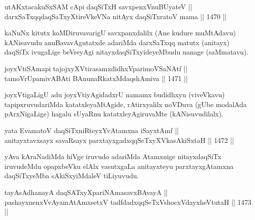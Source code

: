 \begin{shl}
utAKxtacakuSxSAM cApi daqSiTxH savxpenxV\s nuBUyateV || \\
darxSaTxqqdaqSaTxyXtireVkeVNa nitAyx daqSiTxratoV mama \hfill || 1470 ||  
\end{shl}

\begin{artha}
kaNuNx kitutx koMDiruvavarigU savxpanxdalilx (Ane kudure muMtAdavu) kANisuvudu anuBavavAgutatxde adariMda darxSaTxqq matutx (anitayx) daqSiTx ivugaLige beVreyAgi nitayxdaqSiTxyideyeMbudu nanage (saMmatavu).
\end{artha}


\begin{shl}
joyxVtiSAmapi tajojxyXVtirasamxdidhxVparimoVSaNAtf || \\
tamoVrUpamivA\s \s BAti BAnunaRkatxMdaqshAmiva \hfill || 1471 ||  
\end{shl}

\begin{artha}
joyxVtigaLigU adu joyxVtiyAgidadxrU namamx budidhxyu (viveVkavu) tapipxruvudariMda katatxleyaMtAgide, rAtirxyalilx noVDuva (gUbe modalAda pArxNigaLige) hagalu sUyaRnu katatxleyAgiruvaMte (kANisuvudilalx).
\end{artha}


\begin{shl}
yata EvamatoV daqSiTxniRteyxYvA\s \s tamxna iSayxtAmf || \\
anitayxtavxsayx savaRsayx parxtayxgadxqqSeTxyXVkasAkiSxtaH \hfill || 1472 ||  
\end{shl}

\begin{artha}
yAva kAraNadiMda hiVge iruvudo adariMda Atamxnige nitayxdaqSiTx iruvudeMdu opapxbeVku elAlx vasutxgaLa anitayxteyu parxtayxgAtamxna daqSiTxyeMba sAkiSxyiMdaleV tiLiyuvudu.
\end{artha}


\begin{shl}
tayA\s sAdhanayA daqSATxyX\s pariNAmasavxBAvayA ||  \\
pashayxnenxVvAyamAtAmx\s \s setxV tadfdadxqqSeTxVshocxVdayxheVtutaH \hfill || 1473 ||  
\end{shl}

